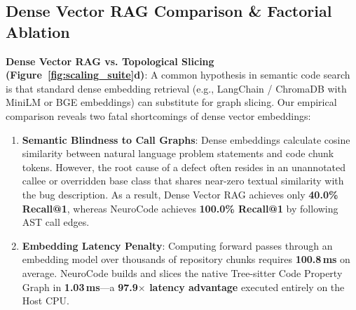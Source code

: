 \documentclass{article}
\begin{document}
\subsection{Dense Vector RAG Comparison \& Factorial Ablation}

\textbf{Dense Vector RAG vs. Topological Slicing (Figure~\ref{fig:scaling_suite}d)}: A common hypothesis in semantic code search is that standard dense embedding retrieval (e.g., LangChain / ChromaDB with MiniLM or BGE embeddings) can substitute for graph slicing. Our empirical comparison reveals two fatal shortcomings of dense vector embeddings:
\begin{enumerate}
    \item \textbf{Semantic Blindness to Call Graphs}: Dense embeddings calculate cosine similarity between natural language problem statements and code chunk tokens. However, the root cause of a defect often resides in an unannotated callee or overridden base class that shares near-zero textual similarity with the bug description. As a result, Dense Vector RAG achieves only \textbf{40.0\% Recall@1}, whereas NeuroCode achieves \textbf{100.0\% Recall@1} by following AST call edges.
    \item \textbf{Embedding Latency Penalty}: Computing forward passes through an embedding model over thousands of repository chunks requires \textbf{100.8\,ms} on average. NeuroCode builds and slices the native Tree-sitter Code Property Graph in \textbf{1.03\,ms}---a \textbf{97.9$\times$ latency advantage} executed entirely on the Host CPU.
\end{enumerate}

\begin{table}[b]
\centering
\small
{}
\caption{\textbf{Factorial Component Ablation Study.} Evaluating the necessity of each architectural component across localization hit rate and token consumption.}
\label{tab:ablation}
\end{table}
\end{document}
